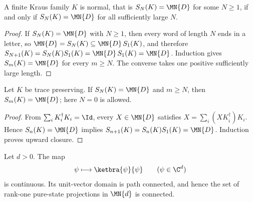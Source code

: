 \begin{lemma}
    \label{lem:kraus_normal_iff_eventually_full_word_span}
    \leanok
    A finite Kraus family $K$ is normal, that is $S_N(K)=\MN{D}$ for some
    $N\geq1$, if and only if $S_N(K)=\MN{D}$ for all sufficiently large $N$.
\end{lemma}

\begin{proof}
    \leanok
    If $S_N(K)=\MN{D}$ with $N\geq1$, then every word of length $N$ ends
    in a letter, so $\MN{D}=S_N(K)\subseteq\MN{D}\,S_1(K)$, and therefore
    $S_{N+1}(K)=S_N(K)S_1(K)=\MN{D}\,S_1(K)=\MN{D}$. Induction gives
    $S_m(K)=\MN{D}$ for every $m\geq N$. The converse takes one positive
    sufficiently large length.
\end{proof}

\begin{theorem}
    \label{thm:kraus_word_span_upward_tp}
    \leanok
    Let $K$ be trace preserving. If $S_N(K)=\MN{D}$ and $m\geq N$, then
    $S_m(K)=\MN{D}$; here $N=0$ is allowed.
\end{theorem}

\begin{proof}
    \leanok
    From $\sum_iK_i^\dagger K_i=\Id$, every $X\in\MN{D}$ satisfies
    $X=\sum_i(XK_i^\dagger)K_i$. Hence $S_n(K)=\MN{D}$ implies
    $S_{n+1}(K)=S_n(K)S_1(K)=\MN{D}$. Induction proves upward closure.
\end{proof}

\begin{theorem}
    \label{thm:wolf_connected_pure_state_proj_image}
    \leanok
    Let $d>0$. The map
    \begin{align}
        \psi\longmapsto\ketbra{\psi}{\psi}
        \qquad(\psi\in\C^d)
        \notag
    \end{align}
    is continuous. Its unit-vector domain is path connected, and hence
    the set of rank-one pure-state projections in $\MN{d}$ is connected.
\end{theorem}

